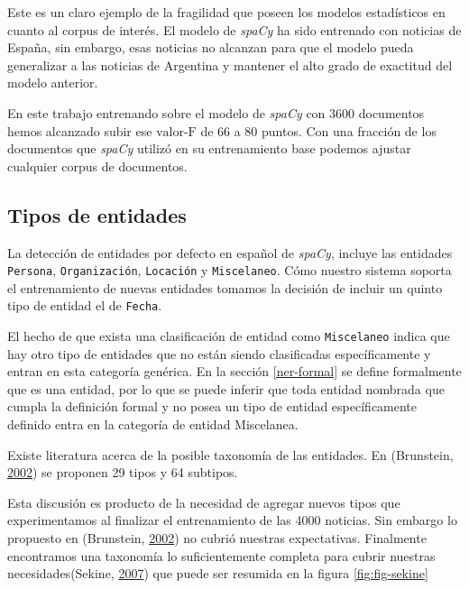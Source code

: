 \documentclass[12pt,a4paper,]{scrartcl}
\begin{document}
Este es un claro ejemplo de la fragilidad que poseen los modelos estadísticos en cuanto al corpus de interés. El modelo de \emph{spaCy} ha sido entrenado con noticias de España, sin embargo, esas noticias no alcanzan para que el modelo pueda generalizar a las noticias de Argentina y mantener el alto grado de exactitud del modelo anterior.

En este trabajo entrenando sobre el modelo de \emph{spaCy} con 3600 documentos hemos alcanzado subir ese \(\text{valor-F}\) de 66 a 80 puntos. Con una fracción de los documentos que \emph{spaCy} utilizó en su entrenamiento base podemos ajustar cualquier corpus de documentos.

\hypertarget{tipos-de-entidades}{%
\subsection{Tipos de entidades}\label{tipos-de-entidades}}

La detección de entidades por defecto en español de \emph{spaCy}, incluye las entidades \texttt{Persona}, \texttt{Organización}, \texttt{Locación} y \texttt{Miscelaneo}. Cómo nuestro sistema soporta el entrenamiento de nuevas entidades tomamos la decisión de incluir un quinto tipo de entidad el de \texttt{Fecha}.

El hecho de que exista una clasificación de entidad como \texttt{Miscelaneo} indica que hay otro tipo de entidades que no están siendo clasificadas específicamente y entran en esta categoría genérica. En la sección \ref{ner-formal} se define formalmente que es una entidad, por lo que se puede inferir que toda entidad nombrada que cumpla la definición formal y no posea un tipo de entidad específicamente definido entra en la categoría de entidad Miscelanea.

Existe literatura acerca de la posible taxonomía de las entidades. En (Brunstein, \protect\hyperlink{ref-brunstein2002}{2002}) se proponen 29 tipos y 64 subtipos.

Esta discusión es producto de la necesidad de agregar nuevos tipos que experimentamos al finalizar el entrenamiento de las 4000 noticias. Sin embargo lo propuesto en (Brunstein, \protect\hyperlink{ref-brunstein2002}{2002}) no cubrió nuestras expectativas. Finalmente encontramos una taxonomía lo suficientemente completa para cubrir nuestras necesidades(Sekine, \protect\hyperlink{ref-Sekine-NER}{2007}) que puede ser resumida en la figura \ref{fig:fig-sekine}
\end{document}

